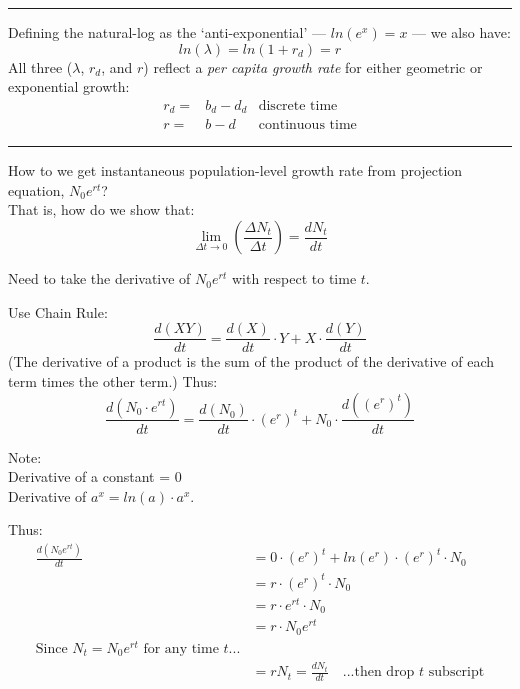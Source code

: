 \documentclass{article}
\newcommand*\circled[1]{\tikz[baseline=(char.base)]{
            \node[shape=circle,draw,inner sep=2pt] (char) {#1};}}
\begin{document}
\rule[0.5ex]{\linewidth}{1pt}

Defining the natural-log as the `anti-exponential' --- $ln(e^x)=x$ --- we also have:
\begin{equation*}
	ln(\lambda)=ln(1+r_d)=r
\end{equation*}
All three ($\lambda$, $r_d$, and $r$) reflect a \emph{per capita growth rate} for either geometric or exponential growth:
\begin{align*}
	r_d= & b_d-d_d &\text{discrete time}\\
	r=& b-d & \text{continuous time}
\end{align*}

\rule[0.5ex]{\linewidth}{1pt}

\pagebreak

\circled{3}  How to we get instantaneous population-level growth rate from projection equation, $N_0 e^{rt}$?\\ That is, how do we show that:
\begin{equation*}
\lim_{\Delta t \to 0}\left(\frac{\Delta N_t}{\Delta t}\right) = \frac{dN_t}{dt}
\end{equation*}

Need to take the derivative of $N_0 e^{rt}$ with respect to time $t$.

Use Chain Rule:
\begin{equation*}
\frac{d(XY)}{dt}=\frac{d(X)}{dt}\cdot Y + X \cdot \frac{d(Y)}{dt}
\end{equation*}
(The derivative of a product is the sum of the product of the derivative of each term times the other term.)
Thus:
\begin{equation*}
\frac{d(N_0 \cdot e^{rt})}{dt}=\frac{d(N_0)}{dt}\cdot (e^r)^t + N_0 \cdot \frac{d((e^r)^t)}{dt}
\end{equation*}

Note:\\
Derivative of a constant = 0\\
Derivative of $a^x = ln(a)\cdot a^x$.

Thus:
\begin{align*}
	\frac{d(N_0 e ^{rt})}{dt} & =0 \cdot (e^r)^t + ln(e^r)\cdot (e^r)^t \cdot N_0\\
	&= r \cdot (e^r)^t \cdot N_0\\
	&= r \cdot e^{rt} \cdot N_0 \\
	&= r \cdot N_0 e^{rt} \\
\text{Since } N_t=N_0 e^{rt} \text{ for any time } t ...&\\
	&=rN_t=\frac{dN_t}{dt} \quad \text{...then drop $t$ subscript}
\end{align*}
\end{document}
